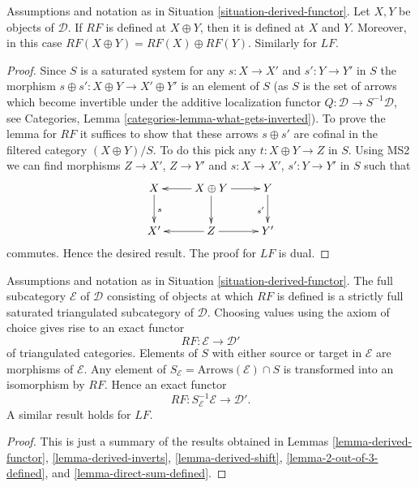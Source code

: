 \begin{lemma}
\label{lemma-direct-sum-defined}
Assumptions and notation as in
Situation \ref{situation-derived-functor}.
Let $X, Y$ be objects of $\mathcal{D}$.
If $RF$ is defined at $X \oplus Y$, then it is defined
at $X$ and $Y$. Moreover, in this case
$RF(X \oplus Y) = RF(X) \oplus RF(Y)$. Similarly for $LF$.
\end{lemma}

\begin{proof}
Since $S$ is a saturated system for any $s : X \to X'$ and $s' : Y \to Y'$
in $S$ the morphism $s \oplus s' : X \oplus Y \to X' \oplus Y'$ is an
element of $S$ (as $S$ is the set of arrows which become invertible
under the additive localization functor
$Q : \mathcal{D} \to S^{-1}\mathcal{D}$, see
Categories, Lemma \ref{categories-lemma-what-gets-inverted}).
To prove the lemma for $RF$ it suffices to show that these arrows
$s \oplus s'$ are cofinal in the filtered category $(X \oplus Y)/S$.
To do this pick any $t : X \oplus Y \to Z$ in $S$.
Using MS2 we can find morphisms $Z \to X'$, $Z \to Y'$
and $s : X \to X'$, $s' : Y \to Y'$ in $S$ such that
$$
\xymatrix{
X \ar[d]^s & X \oplus Y \ar[d] \ar[l] \ar[r] & Y \ar[d]_{s'} \\
X' & Z \ar[l] \ar[r] & Y'
}
$$
commutes. Hence the desired result. The proof for $LF$ is dual.
\end{proof}

\begin{proposition}
\label{proposition-derived-functor}
Assumptions and notation as in
Situation \ref{situation-derived-functor}.
The full subcategory $\mathcal{E}$ of $\mathcal{D}$ consisting of
objects at which $RF$ is defined is a strictly full saturated triangulated
subcategory of $\mathcal{D}$. Choosing values using the axiom of choice
gives rise to an exact functor
$$
RF : \mathcal{E} \longrightarrow \mathcal{D}'
$$
of triangulated categories. Elements of $S$ with either source or target
in $\mathcal{E}$ are morphisms of $\mathcal{E}$. Any element of
$S_{\mathcal{E}} = \text{Arrows}(\mathcal{E}) \cap S$
is transformed into an isomorphism by $RF$. Hence an exact functor
$$
RF : S_{\mathcal{E}}^{-1}\mathcal{E} \longrightarrow \mathcal{D}'.
$$
A similar result holds for $LF$.
\end{proposition}

\begin{proof}
This is just a summary of the results obtained in
Lemmas \ref{lemma-derived-functor},
\ref{lemma-derived-inverts},
\ref{lemma-derived-shift},
\ref{lemma-2-out-of-3-defined}, and
\ref{lemma-direct-sum-defined}.
\end{proof}

